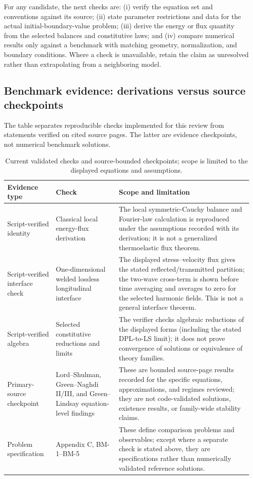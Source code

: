 For any candidate, the next checks are: (i) verify the equation set and conventions against its source; (ii) state parameter restrictions and data for the actual initial-boundary-value problem; (iii) derive the energy or flux quantity from the selected balances and constitutive laws; and (iv) compare numerical results only against a benchmark with matching geometry, normalization, and boundary conditions. Where a check is unavailable, retain the claim as unresolved rather than extrapolating from a neighboring model.

\subsection{Benchmark evidence: derivations versus source checkpoints}
\label{sec:benchmark-evidence}

The table separates reproducible checks implemented for this review from statements verified on cited source pages. The latter are evidence checkpoints, not numerical benchmark solutions.

\begin{table}[H]
\centering
\small
\caption{Current validated checks and source-bounded checkpoints; scope is limited to the displayed equations and assumptions.}
\label{tab:validated_checkpoints}
\begin{tabularx}{\textwidth}{@{}p{3.1cm}p{3.2cm}X@{}}
\toprule
\textbf{Evidence type} & \textbf{Check} & \textbf{Scope and limitation} \\
\midrule
Script-verified identity & Classical local energy-flux derivation & The local symmetric-Cauchy balance and Fourier-law calculation is reproduced under the assumptions recorded with its derivation; it is not a generalized thermoelastic flux theorem. \\
Script-verified interface check & One-dimensional welded lossless longitudinal interface & The displayed stress--velocity flux gives the stated reflected/transmitted partition; the two-wave cross-term is shown before time averaging and averages to zero for the selected harmonic fields. This is not a general interface theorem. \\
Script-verified algebra & Selected constitutive reductions and limits & The verifier checks algebraic reductions of the displayed forms (including the stated DPL-to-LS limit); it does not prove convergence of solutions or equivalence of theory families. \\
Primary-source checkpoint & Lord--Shulman, Green--Naghdi II/III, and Green--Lindsay equation-level findings & These are bounded source-page results recorded for the specific equations, approximations, and regimes reviewed; they are not code-validated solutions, existence results, or family-wide stability claims. \\
Problem specification & Appendix C, BM-1--BM-5 & These define comparison problems and observables; except where a separate check is stated above, they are specifications rather than numerically validated reference solutions. \\
\bottomrule
\end{tabularx}
\end{table}

